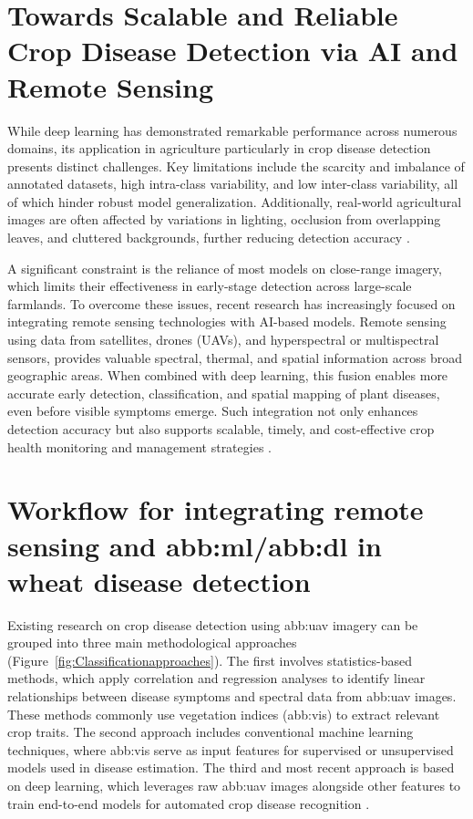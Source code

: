 \section{Towards Scalable and Reliable Crop Disease Detection via AI and Remote Sensing}

While deep learning has demonstrated remarkable performance across numerous domains, its application in agriculture particularly in crop disease detection presents distinct challenges. Key limitations include the scarcity and imbalance of annotated datasets, high intra-class variability, and low inter-class variability, all of which hinder robust model generalization. Additionally, real-world agricultural images are often affected by variations in lighting, occlusion from overlapping leaves, and cluttered backgrounds, further reducing detection accuracy \parencite{alzubaidi2021review}.

A significant constraint is the reliance of most models on close-range imagery, which limits their effectiveness in early-stage detection across large-scale farmlands. To overcome these issues, recent research has increasingly focused on integrating remote sensing technologies with AI-based models. Remote sensing using data from satellites, drones (UAVs), and hyperspectral or multispectral sensors, provides valuable spectral, thermal, and spatial information across broad geographic areas. When combined with deep learning, this fusion enables more accurate early detection, classification, and spatial mapping of plant diseases, even before visible symptoms emerge. Such integration not only enhances detection accuracy but also supports scalable, timely, and cost-effective crop health monitoring and management strategies \parencite{wang2024integration}.


\section{Workflow for integrating remote sensing and \gls{abb:ml}/\gls{abb:dl} in wheat disease detection}
Existing research on crop disease detection using \gls{abb:uav} imagery can be grouped into three main methodological approaches (Figure~\ref{fig:Classificationapproaches}). The first involves statistics-based methods, which apply correlation and regression analyses to identify linear relationships between disease symptoms and spectral data from \gls{abb:uav} images. These methods commonly use vegetation indices (\gls{abb:vi}s) to extract relevant crop traits. The second approach includes conventional machine learning techniques, where \gls{abb:vi}s serve as input features for supervised or unsupervised models used in disease estimation. The third and most recent approach is based on deep learning, which leverages raw \gls{abb:uav} images alongside other features to train end-to-end models for automated crop disease recognition \parencite{shahi2023recent}.




